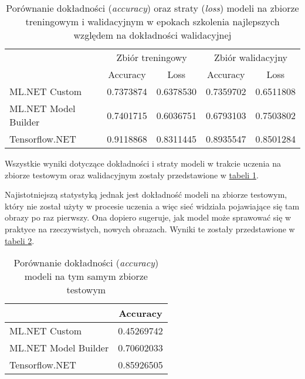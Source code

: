 \begin{table}[ht]
  \centering
  \begin{tabular}{|l|r|r|r|r|}
    \hline
                         & \multicolumn{2}{c|}{Zbiór treningowy}                                          & \multicolumn{2}{c|}{Zbiór walidacyjny}                      \\
    \cline{2-5}
                         & \multicolumn{1}{|c|}{Accuracy}        & \multicolumn{1}{|c|}{Loss}             & \multicolumn{1}{|c|}{Accuracy} & \multicolumn{1}{|c|}{Loss} \\
    \hline
    ML.NET Custom        & 0.7373874                             & 0.6378530                              & 0.7359702                      & 0.6511808                  \\
    ML.NET Model Builder & 0.7401715                             & 0.6036751                              & 0.6793103                      & 0.7503802                  \\
    Tensorflow.NET       & 0.9118868                             & 0.8311445                              & 0.8935547                      & 0.8501284                  \\
    \hline
  \end{tabular}
  \caption[Porównanie dokładności oraz straty modeli na zbiorze treningowym i walidacyjnym]{Porównanie dokładności (\emph{accuracy}) oraz straty (\emph{loss}) modeli na zbiorze treningowym i walidacyjnym w epokach szkolenia najlepszych względem na dokładności walidacyjnej}
  \label{tab:train_validation_metric_comparison}
\end{table}

Wszystkie wyniki dotyczące dokładności i straty modeli w trakcie uczenia na zbiorze testowym oraz walidacyjnym zostały przedstawione w \hyperref[tab:train_validation_metric_comparison]{tabeli \ref*{tab:train_validation_metric_comparison}}.

Najistotniejszą statystyką jednak jest dokładność modeli na zbiorze testowym, który nie został użyty w procesie uczenia a więc sieć widziała pojawiające się tam obrazy po raz pierwszy.
Ona dopiero sugeruje, jak model może sprawować się w praktyce na rzeczywistych, nowych obrazach.
Wyniki te zostały przedstawione w \hyperref[tab:test_accuracy_comparison]{tabeli \ref*{tab:test_accuracy_comparison}}.

\begin{table}[ht]
  \centering
  \begin{tabular}{|l|r|}
    \hline
                         & \multicolumn{1}{|c|}{Accuracy} \\
    \hline
    ML.NET Custom        & 0.45269742                     \\
    ML.NET Model Builder & 0.70602033                     \\
    Tensorflow.NET       & 0.85926505                     \\
    \hline
  \end{tabular}
  \caption[Porównanie dokładności modeli na tym samym zbiorze testowym]{Porównanie dokładności (\emph{accuracy}) modeli na tym samym zbiorze testowym}
  \label{tab:test_accuracy_comparison}
\end{table}

